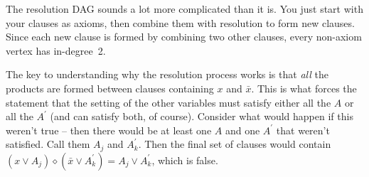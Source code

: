 \vskip 0.01in 

\noindent [p 54] The resolution DAG sounds a lot more complicated than it is.
You just start with your clauses as axioms, then combine them with resolution
to form new clauses.  Since each new clause is formed by combining two
other clauses, every non-axiom vertex has in-degree~2.

\vskip 0.01in 

\noindent [p 60] The key to understanding why the resolution process works
is that {\it all} the products are formed between clauses containing $x$ and $\bar x$.
This is what forces the statement that the setting of the other variables must
satisfy either all the $A$ or all the $A^{\prime}$ (and can satisfy both, of course).
Consider what would happen if this weren't true -- then there would be at least
one $A$ and one $A^{\prime}$ that weren't satisfied.  Call them $A_j$ and $A^{\prime}_k$.
Then the final set of clauses would contain 
$\left(x \vee A_j\right) \diamond \left(\bar x \vee A^{\prime}_k\right) = A_j \vee A^{\prime}_k$,
which is false.

\bye